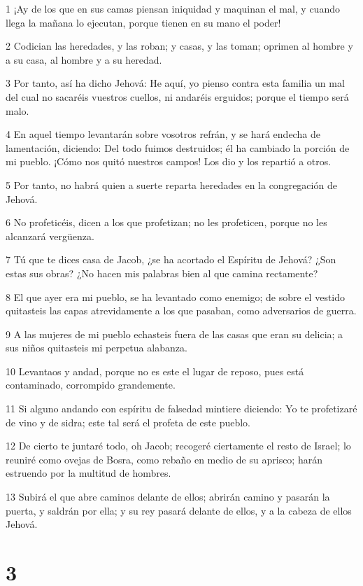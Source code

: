 \par 1 ¡Ay de los que en sus camas piensan iniquidad y maquinan el mal, y cuando llega la mañana lo ejecutan, porque tienen en su mano el poder!
\par 2 Codician las heredades, y las roban; y casas, y las toman; oprimen al hombre y a su casa, al hombre y a su heredad.
\par 3 Por tanto, así ha dicho Jehová: He aquí, yo pienso contra esta familia un mal del cual no sacaréis vuestros cuellos, ni andaréis erguidos; porque el tiempo será malo.
\par 4 En aquel tiempo levantarán sobre vosotros refrán, y se hará endecha de lamentación, diciendo: Del todo fuimos destruidos; él ha cambiado la porción de mi pueblo. ¡Cómo nos quitó nuestros campos! Los dio y los repartió a otros.
\par 5 Por tanto, no habrá quien a suerte reparta heredades en la congregación de Jehová.
\par 6 No profeticéis, dicen a los que profetizan; no les profeticen, porque no les alcanzará vergüenza.
\par 7 Tú que te dices casa de Jacob, ¿se ha acortado el Espíritu de Jehová? ¿Son estas sus obras? ¿No hacen mis palabras bien al que camina rectamente?
\par 8 El que ayer era mi pueblo, se ha levantado como enemigo; de sobre el vestido quitasteis las capas atrevidamente a los que pasaban, como adversarios de guerra.
\par 9 A las mujeres de mi pueblo echasteis fuera de las casas que eran su delicia; a sus niños quitasteis mi perpetua alabanza.
\par 10 Levantaos y andad, porque no es este el lugar de reposo, pues está contaminado, corrompido grandemente.
\par 11 Si alguno andando con espíritu de falsedad mintiere diciendo: Yo te profetizaré de vino y de sidra; este tal será el profeta de este pueblo.
\par 12 De cierto te juntaré todo, oh Jacob; recogeré ciertamente el resto de Israel; lo reuniré como ovejas de Bosra, como rebaño en medio de su aprisco; harán estruendo por la multitud de hombres.
\par 13 Subirá el que abre caminos delante de ellos; abrirán camino y pasarán la puerta, y saldrán por ella; y su rey pasará delante de ellos, y a la cabeza de ellos Jehová.

\chapter{3}


